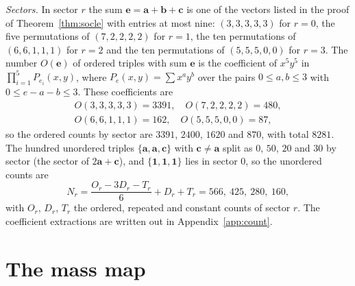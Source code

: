 \documentclass[11pt]{amsart}
\theoremstyle{definition}
\theoremstyle{remark}
\newcommand{\bb}{\mathbf{b}}
\newcommand{\cc}{\mathbf{c}}
\newcommand{\va}{\mathbf{a}}
\newcommand{\ee}{\mathbf{e}}
\newcommand{\one}{\mathbf{1}}
\begin{document}
\emph{Sectors.} In sector $r$ the sum $\ee=\va+\bb+\cc$ is one of the
vectors listed in the proof of Theorem~\ref{thm:socle} with entries at most
nine: $(3,3,3,3,3)$ for $r=0$, the five permutations of $(7,2,2,2,2)$ for
$r=1$, the ten permutations of $(6,6,1,1,1)$ for $r=2$ and the ten
permutations of $(5,5,5,0,0)$ for $r=3$. The number $O(\ee)$ of ordered
triples with sum $\ee$ is the coefficient of $x^5y^5$ in
$\prod_{i=1}^5P_{e_i}(x,y)$, where $P_e(x,y)=\sum x^ay^b$ over the pairs
$0\le a,b\le3$ with $0\le e-a-b\le3$. These coefficients are
\begin{gather*}
O(3,3,3,3,3)=3391,\quad O(7,2,2,2,2)=480,\\
O(6,6,1,1,1)=162,\quad O(5,5,5,0,0)=87,
\end{gather*}
so the ordered counts by sector are $3391$, $2400$, $1620$ and $870$, with
total $8281$. The hundred unordered triples $\{\va,\va,\cc\}$ with
$\cc\ne\va$ split as $0$, $50$, $20$ and $30$ by sector (the sector of
$2\va+\cc$), and $\{\one,\one,\one\}$ lies in sector $0$, so the unordered
counts are
\[
N_r=\frac{O_r-3D_r-T_r}{6}+D_r+T_r=566,\ 425,\ 280,\ 160,
\]
with $O_r$, $D_r$, $T_r$ the ordered, repeated and constant counts of
sector $r$. The coefficient extractions are written out in
Appendix~\ref{app:count}.

\section{The mass map}\label{sec:mass}
\end{document}
